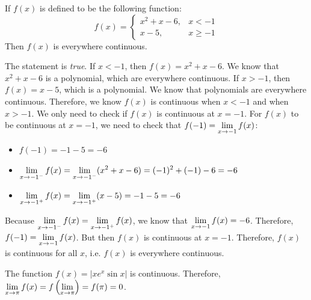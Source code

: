 \documentclass[11pt,letterpaper]{article}
\begin{document}
 If $f(x)$ is defined to be the following function: 
	\[
	f(x)= 
	\begin{cases}
	x^2 + x - 6, & x < -1 \\
	x - 5, & x \geq -1 
	\end{cases}
	\]
Then $f(x)$ is everywhere continuous. \pspace

\sol The statement is \textit{true}. If $x < -1$, then $f(x)= x^2 + x - 6$. We know that $x^2 + x - 6$ is a polynomial, which are everywhere continuous. If $x > -1$, then $f(x)= x - 5$, which is a polynomial. We know that polynomials are everywhere continuous. Therefore, we know $f(x)$ is continuous when $x < -1$ and when $x > -1$. We only need to check if $f(x)$ is continuous at $x= -1$. For $f(x)$ to be continuous at $x= -1$, we need to check that $\displaystyle f(-1)= \lim_{x \to -1} f(x)$:
	\begin{itemize}
	\item $f(-1)= -1 - 5= -6$
	\item $\displaystyle\lim_{x \to -1^-} f(x)= \lim_{x \to -1^-} (x^2 + x - 6)= (-1)^2 + (-1) - 6= -6$
	\item $\displaystyle\lim_{x \to -1^+} f(x)= \lim_{x \to -1^+} (x - 5)= -1 - 5= -6$
	\end{itemize}
Because $\displaystyle\lim_{x \to -1^-} f(x)= \displaystyle\lim_{x \to -1^+} f(x)$, we know that $\displaystyle\lim_{x \to -1} f(x)= -6$. Therefore, $\displaystyle f(-1)= \lim_{x \to -1} f(x)$. But then $f(x)$ is continuous at $x= -1$. Therefore, $f(x)$ is continuous for all $x$, i.e. $f(x)$ is everywhere continuous. 



\newpage



 The function $f(x)= |xe^x \sin x|$ is continuous. Therefore, $\displaystyle\lim_{x \to \pi} f(x)= f \left( \lim_{x \to \pi} \right)= f(\pi)= 0$. \pspace
\end{document}
